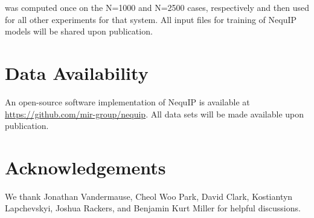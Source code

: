 \documentclass[11pt]{article}
\begin{document}
was computed once on the N=1000  and N=2500 cases, respectively and then used for all other experiments for that system. All input files for training of NequIP models will be shared upon publication. 

\begin{table}[!htbp]
\centering
{}
\caption{Tensor rank $l$, feature size, radial cutoff in units of [\AA], as well as energy and force weights used in the joint loss function. All models were trained with even and odd features, i.e. a tensor rank of $l=1$ and 32 features corresponds to $32x0\mathrm{o} + 32x0\mathrm{e} + 32x1\mathrm{o} + 32x1\mathrm{e}$. The force weightings for formate on Cu, LiPO, LiPS, and the water system for sample efficiency tests stem from $N_{atoms}^2$. 
\label{tab:hyper}}
\end{table}

\section{Data Availability}

An open-source software implementation of NequIP is available at \url{https://github.com/mir-group/nequip}. All data sets will be made available upon publication. 



\section{Acknowledgements}
We thank Jonathan Vandermause, Cheol Woo Park, David Clark, Kostiantyn Lapchevskyi, Joshua Rackers, and Benjamin Kurt Miller for helpful discussions.\\ 
\end{document}

